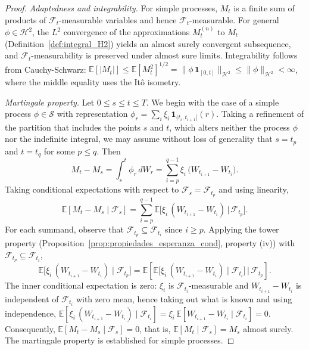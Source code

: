 \documentclass[11pt,a4paper,oneside]{report}
\theoremstyle{plain}
\theoremstyle{definition}
\theoremstyle{remark}
\newcommand{\E}{\mathbb{E}}
\newcommand{\F}{\mathcal{F}}
\newcommand{\1}{\mathbf{1}}
\begin{document}
\begin{proof}
\emph{Adaptedness and integrability.} For simple processes, $M_t$ is
a finite sum of products of $\F_t$-measurable variables and hence
$\F_t$-measurable. For general $\phi \in \mathcal{H}^2$, the $L^2$
convergence of the approximations $M_t^{(n)}$ to $M_t$
(Definition~\ref{def:integral_H2}) yields an almost surely convergent
subsequence, and $\F_t$-measurability is preserved under almost sure
limits. Integrability follows from Cauchy-Schwarz:
$\E[|M_t|] \leq \E[M_t^2]^{1/2} = \|\phi\, \mathbf{1}_{[0, t]}\|_{\mathcal{H}^2} \leq \|\phi\|_{\mathcal{H}^2} < \infty$,
where the middle equality uses the Itô isometry.

\emph{Martingale property.} Let $0 \leq s \leq t \leq T$. We begin
with the case of a simple process $\phi \in \mathcal{S}$ with
representation $\phi_r = \sum_i \xi_i\, \mathbf{1}_{(t_i, t_{i+1}]}(r)$.
Taking a refinement of the partition that includes the points $s$ and
$t$, which alters neither the process $\phi$ nor the indefinite
integral, we may assume without loss of generality that $s = t_p$
and $t = t_q$ for some $p \leq q$. Then
\begin{equation*}
  M_t - M_s = \int_s^t \phi_r\, dW_r
            = \sum_{i = p}^{q-1} \xi_i\,
              \bigl(W_{t_{i+1}} - W_{t_i}\bigr).
\end{equation*}
Taking conditional expectations with respect to $\F_s = \F_{t_p}$ and
using linearity,
\begin{equation*}
  \E[M_t - M_s \mid \F_s]
  = \sum_{i = p}^{q-1} \E\bigl[\xi_i\, (W_{t_{i+1}} - W_{t_i})
                               \,\big|\, \F_{t_p}\bigr].
\end{equation*}
For each summand, observe that $\F_{t_p} \subseteq \F_{t_i}$ since
$i \geq p$. Applying the tower property
(Proposition~\ref{prop:propiedades_esperanza_cond}, property (iv))
with $\F_{t_p} \subseteq \F_{t_i}$,
\begin{equation*}
  \E\bigl[\xi_i\, (W_{t_{i+1}} - W_{t_i}) \mid \F_{t_p}\bigr]
  = \E\!\left[\E\bigl[\xi_i\, (W_{t_{i+1}} - W_{t_i})
                       \mid \F_{t_i}\bigr] \,\Big|\, \F_{t_p}\right].
\end{equation*}
The inner conditional expectation is zero: $\xi_i$ is
$\F_{t_i}$-measurable and $W_{t_{i+1}} - W_{t_i}$ is independent of
$\F_{t_i}$ with zero mean, hence taking out what is known and using
independence,
$\E[\xi_i\, (W_{t_{i+1}} - W_{t_i}) \mid \F_{t_i}] = \xi_i\, \E[W_{t_{i+1}} - W_{t_i} \mid \F_{t_i}] = 0$.
Consequently, $\E[M_t - M_s \mid \F_s] = 0$, that is,
$\E[M_t \mid \F_s] = M_s$ almost surely. The martingale property is
established for simple processes.


\end{proof}
\end{document}
